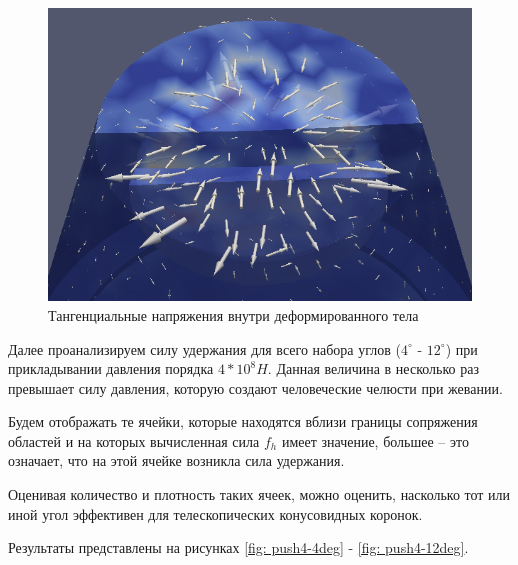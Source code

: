 \documentclass[a4paper, 14pt]{extreport}
\begin{document}
\begin{figure}[H]
	\center
	\includegraphics[scale=0.55]{pictures/result_push_shear_stress_partial.png}
	\caption{Тангенциальные напряжения  внутри деформированного тела}
	\label{fig: result_push_shear_stress_partial}
\end{figure}

Далее проанализируем силу удержания для всего набора углов 
($4^{\circ}$ - $12^{\circ}$) при прикладывании давления 
порядка $4*10^8H$. Данная величина в несколько раз
превышает 
силу давления, которую создают человеческие челюсти при
жевании.

Будем отображать те ячейки, которые находятся вблизи 
границы сопряжения областей и на которых вычисленная сила
$f_h$ имеет значение, большее -- это означает, что на этой 
ячейке возникла сила удержания.

Оценивая количество и плотность таких ячеек, можно оценить,
насколько тот или иной угол эффективен для телескопических 
конусовидных коронок.

Результаты представлены на рисунках \ref{fig: push4-4deg} - 
\ref{fig: push4-12deg}.
\end{document}
